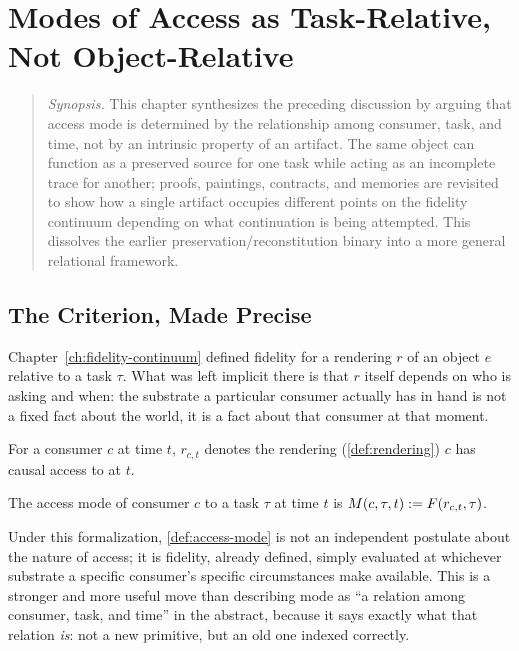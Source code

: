 \chapter{Modes of Access as Task-Relative, Not Object-Relative}
\label{ch:mode-relativity}

\begin{quotation}
\noindent\textit{Synopsis.} This chapter synthesizes the preceding
discussion by arguing that access mode is determined by the relationship
among consumer, task, and time, not by an intrinsic property of an
artifact. The same object can function as a preserved source for one task
while acting as an incomplete trace for another; proofs, paintings,
contracts, and memories are revisited to show how a single artifact
occupies different points on the fidelity continuum depending on what
continuation is being attempted. This dissolves the earlier
preservation/reconstitution binary into a more general relational
framework.
\end{quotation}

\section{The Criterion, Made Precise}

Chapter~\ref{ch:fidelity-continuum} defined fidelity for a rendering $r$
of an object $e$ relative to a task $\tau$. What was left implicit there
is that $r$ itself depends on who is asking and when: the substrate a
particular consumer actually has in hand is not a fixed fact about the
world, it is a fact about that consumer at that moment.

\begin{definition}
\label{def:available-substrate}
For a consumer $c$ at time $t$, $r_{c,t}$ denotes the rendering
(\cref{def:rendering}) $c$ has causal access to at $t$.
\end{definition}

\begin{definition}
\label{def:access-mode}
The access mode of consumer $c$ to a task $\tau$ at time $t$ is
$M(c,\tau,t) := F(r_{c,t},\tau)$.
\end{definition}

Under this formalization, \cref{def:access-mode} is not an independent
postulate about the nature of access; it is fidelity, already defined,
simply evaluated at whichever substrate a specific consumer's specific
circumstances make available. This is a stronger and more useful move
than describing mode as ``a relation among consumer, task, and time'' in
the abstract, because it says exactly what that relation \emph{is}: not
a new primitive, but an old one indexed correctly.

